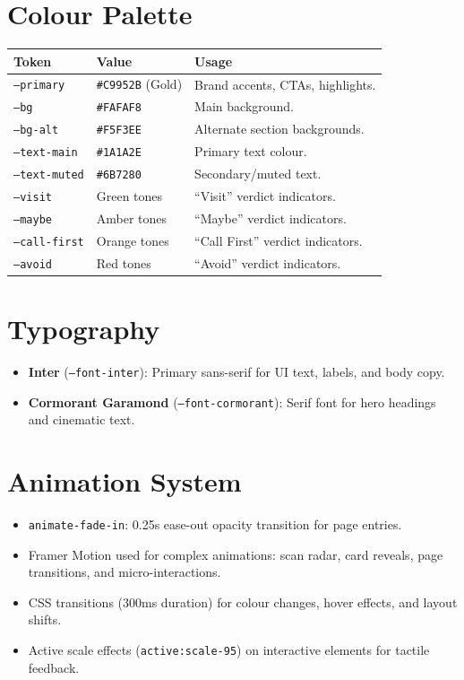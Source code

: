 \documentclass[12pt, a4paper, oneside]{report}
\begin{document}
\section{Colour Palette}

\begin{longtable}{p{4cm} p{4cm} p{5cm}}
\toprule
\textbf{Token} & \textbf{Value} & \textbf{Usage} \\
\midrule
\endhead
\texttt{--primary} & \texttt{\#C9952B} (Gold) & Brand accents, CTAs, highlights. \\
\texttt{--bg} & \texttt{\#FAFAF8} & Main background. \\
\texttt{--bg-alt} & \texttt{\#F5F3EE} & Alternate section backgrounds. \\
\texttt{--text-main} & \texttt{\#1A1A2E} & Primary text colour. \\
\texttt{--text-muted} & \texttt{\#6B7280} & Secondary/muted text. \\
\texttt{--visit} & Green tones & ``Visit'' verdict indicators. \\
\texttt{--maybe} & Amber tones & ``Maybe'' verdict indicators. \\
\texttt{--call-first} & Orange tones & ``Call First'' verdict indicators. \\
\texttt{--avoid} & Red tones & ``Avoid'' verdict indicators. \\
\bottomrule
\end{longtable}

\section{Typography}

\begin{itemize}[leftmargin=2em]
  \item \textbf{Inter} (\texttt{--font-inter}): Primary sans-serif for UI text, labels, and body copy.
  \item \textbf{Cormorant Garamond} (\texttt{--font-cormorant}): Serif font for hero headings and cinematic text.
\end{itemize}

\section{Animation System}

\begin{itemize}[leftmargin=2em]
  \item \texttt{animate-fade-in}: 0.25s ease-out opacity transition for page entries.
  \item Framer Motion used for complex animations: scan radar, card reveals, page transitions, and micro-interactions.
  \item CSS transitions (300ms duration) for colour changes, hover effects, and layout shifts.
  \item Active scale effects (\texttt{active:scale-95}) on interactive elements for tactile feedback.
\end{itemize}
\end{document}
